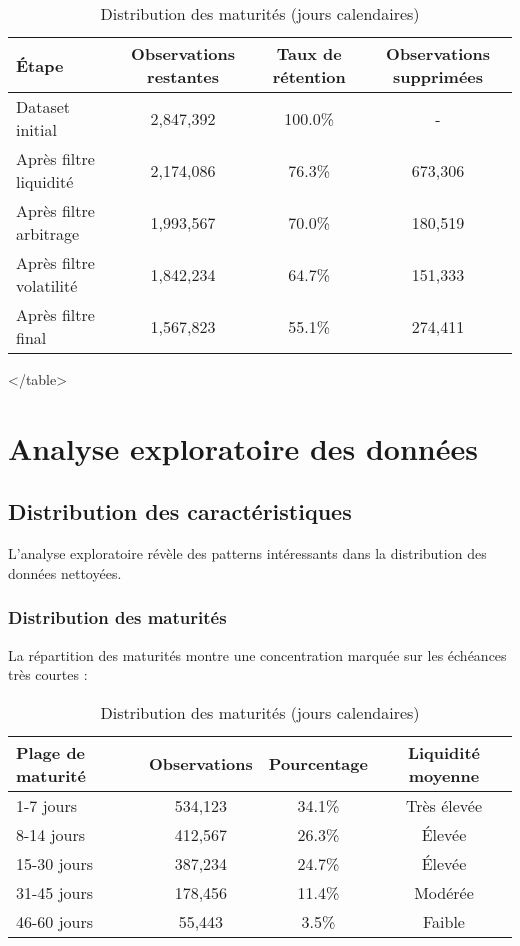 \begin{table}[H]
\centering
\caption{Impact séquentiel des filtres de qualité}
\begin{tabular}{@{}lccc@{}}
\toprule
\textbf{Étape} & \textbf{Observations restantes} & \textbf{Taux de rétention} & \textbf{Observations supprimées} \\
\midrule
Dataset initial & 2,847,392 & 100.0\% & - \\
Après filtre liquidité & 2,174,086 & 76.3\% & 673,306 \\
Après filtre arbitrage & 1,993,567 & 70.0\% & 180,519 \\
Après filtre volatilité & 1,842,234 & 64.7\% & 151,333 \\
Après filtre final & 1,567,823 & 55.1\% & 274,411 \\
\bottomrule
\end{tabular}
</table>

\section{Analyse exploratoire des données}

\subsection{Distribution des caractéristiques}

L'analyse exploratoire révèle des patterns intéressants dans la distribution des données nettoyées.

\subsubsection{Distribution des maturités}

La répartition des maturités montre une concentration marquée sur les échéances très courtes :

\begin{table}[H]
\centering
\caption{Distribution des maturités (jours calendaires)}
\begin{tabular}{@{}lccc@{}}
\toprule
\textbf{Plage de maturité} & \textbf{Observations} & \textbf{Pourcentage} & \textbf{Liquidité moyenne} \\
\midrule
1-7 jours & 534,123 & 34.1\% & Très élevée \\
8-14 jours & 412,567 & 26.3\% & Élevée \\
15-30 jours & 387,234 & 24.7\% & Élevée \\
31-45 jours & 178,456 & 11.4\% & Modérée \\
46-60 jours & 55,443 & 3.5\% & Faible \\
\bottomrule
\end{tabular}
\end{table}


\end{table}
